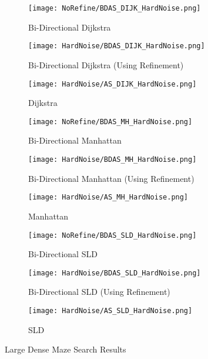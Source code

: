 \documentclass[conference]{IEEEtran}
\begin{document}
\begin{figure*}
    \centering
     \begin{subfigure}{.30\textwidth}
        \texttt{[image: NoRefine/BDAS\_DIJK\_HardNoise.png]}
        \caption{Bi-Directional Dijkstra}
        \label{fig:NR_BDIJK}
    \end{subfigure} \hfill
    \begin{subfigure}{.30\textwidth}
        \texttt{[image: HardNoise/BDAS\_DIJK\_HardNoise.png]}
        \caption{Bi-Directional Dijkstra (Using Refinement)}
        \label{fig:HN_BDIJK}
    \end{subfigure} \hfill
    \begin{subfigure}{.30\textwidth}
        \texttt{[image: HardNoise/AS\_DIJK\_HardNoise.png]}
        \caption{Dijkstra}
        \label{fig:HN_DIJK}
    \end{subfigure} \hfill
     \begin{subfigure}{.30\textwidth}
        \texttt{[image: NoRefine/BDAS\_MH\_HardNoise.png]}
        \caption{Bi-Directional Manhattan}
        \label{fig:NR_BMH}
    \end{subfigure} \hfill
    \begin{subfigure}{.30\textwidth}
        \texttt{[image: HardNoise/BDAS\_MH\_HardNoise.png]}
        \caption{Bi-Directional Manhattan (Using Refinement)}
        \label{fig:HN_BMH}
    \end{subfigure} \hfill
    \begin{subfigure}{.30\textwidth}
        \texttt{[image: HardNoise/AS\_MH\_HardNoise.png]}
        \caption{Manhattan}
        \label{fig:HN_MH}
    \end{subfigure} \hfill
    \begin{subfigure}{.30\textwidth}
        \texttt{[image: NoRefine/BDAS\_SLD\_HardNoise.png]}
        \caption{Bi-Directional SLD}
        \label{fig:NR_BSLD}
    \end{subfigure} \hfill
    \begin{subfigure}{.30\textwidth}
        \texttt{[image: HardNoise/BDAS\_SLD\_HardNoise.png]}
        \caption{Bi-Directional SLD (Using Refinement)}
        \label{fig:HN_BSLD}
    \end{subfigure} \hfill
    \begin{subfigure}{.30\textwidth}
        \texttt{[image: HardNoise/AS\_SLD\_HardNoise.png]}
        \caption{SLD}
        \label{fig:HN_SLD}
    \end{subfigure} \hfill
  
    \caption{Large Dense Maze Search Results}    
    \label{fig:HardNoise}
\end{figure*}
\end{document}
